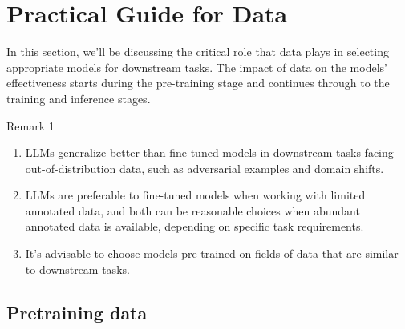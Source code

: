 \documentclass[manuscript,screen, nonacm]{acmart}
\begin{document}
\section{Practical Guide for Data}

In this section, we'll be discussing the critical role that data plays in selecting appropriate models for downstream tasks. The impact of data on the models' effectiveness starts during the pre-training stage and continues through to the training and inference stages.



\begin{applebox}{Remark 1}
\begin{enumerate}[leftmargin=0.4cm]




\item LLMs generalize better than fine-tuned models in downstream tasks facing out-of-distribution data, such as  adversarial examples and domain shifts.
\item LLMs are preferable to fine-tuned models when working with limited annotated data, and both can be reasonable choices when abundant annotated data is available, depending on specific task requirements.
\item It's advisable to choose models pre-trained on fields of data that are similar to downstream tasks.

\end{enumerate}
\end{applebox}





\subsection{Pretraining data}
\end{document}
